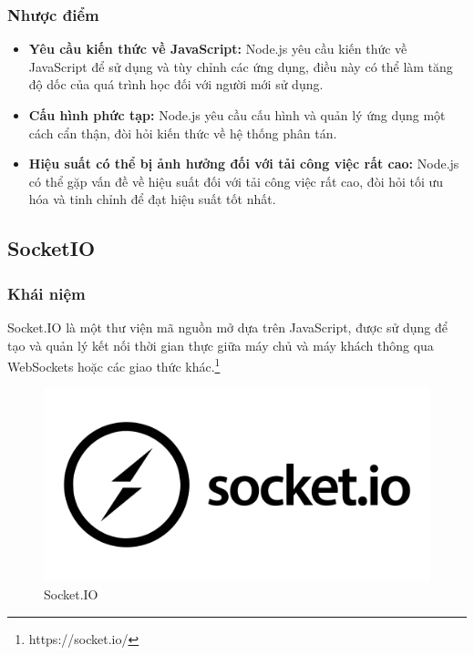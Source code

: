 \subsubsection{Nhược điểm}
\begin{itemize}
  \item \textbf{Yêu cầu kiến thức về JavaScript:} Node.js yêu cầu kiến thức về JavaScript để sử dụng và tùy chỉnh các ứng dụng, điều này có thể làm tăng độ dốc của quá trình học đối với người mới sử dụng.
  \item \textbf{Cấu hình phức tạp:} Node.js yêu cầu cấu hình và quản lý ứng dụng một cách cẩn thận, đòi hỏi kiến thức về hệ thống phân tán.
  \item \textbf{Hiệu suất có thể bị ảnh hưởng đối với tải công việc rất cao:} Node.js có thể gặp vấn đề về hiệu suất đối với tải công việc rất cao, đòi hỏi tối ưu hóa và tinh chỉnh để đạt hiệu suất tốt nhất.
\end{itemize}
\subsection{SocketIO}
\subsubsection{Khái niệm}
\noindent Socket.IO là một thư viện mã nguồn mở dựa trên JavaScript, được sử dụng để tạo và quản lý kết nối thời gian thực giữa máy chủ và máy khách thông qua WebSockets hoặc các giao thức khác.\footnote{https://socket.io/}
\begin{figure}[H]
  \begin{center}
    \includegraphics[scale=0.35]{images/hieu/phuluc/socketio.png}
    \caption{Socket.IO}
  \end{center}
\end{figure}
